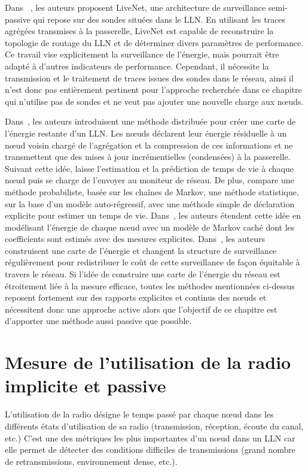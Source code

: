 Dans ~\cite{Chen:2008im}, les auteurs proposent LiveNet, une architecture de surveillance semi-passive  qui repose sur des sondes situées dans le \ac{LLN}.
En utilisant les traces agrégées transmises à la passerelle, LiveNet est capable de reconstruire la topologie de routage du \ac{LLN} et de déterminer divers paramètres de performance.
Ce travail vise explicitement la surveillance de l'énergie, mais pourrait être adapté à d'autres indicateurs de performance.
Cependant, il nécessite la transmission et le traitement de traces issues des sondes dans le réseau, ainsi il n'est donc pas entièrement pertinent pour l'approche recherchée dans ce chapitre qui n'utilise pas de sondes et ne veut pas ajouter une nouvelle charge aux nœuds.

Dans~\cite{Zhao:2002df}, les auteurs introduisent une méthode distribuée pour créer une carte de l'énergie restante d'un \ac{LLN}.
Les nœuds déclarent leur énergie résiduelle à un nœud voisin chargé de l'agrégation et la compression de ces informations et ne transmettent que des mises à jour incrémentielles (condensées) à la passerelle.
Suivant cette idée, \cite{Mini:2004zj} laisse l'estimation et la prédiction de temps de vie à chaque nœud puis se charge de l'envoyer au moniteur de réseau.
De plus, \cite{Mini:2004zj} compare une méthode probabiliste, basée sur les chaînes de Markov, une méthode statistique, sur la base d'un modèle auto-régressif, avec une  méthode simple de déclaration explicite pour estimer un temps de vie.
Dans~\cite{Hu:2007tb}, les auteurs étendent cette idée en modélisant l'énergie de chaque nœud avec un modèle de Markov caché dont les coefficients sont estimés avec des mesures explicites.
Dans~\cite{Chan:2009hl}, les auteurs construisent une carte de l'énergie et changent la structure de surveillance régulièrement pour redistribuer le coût de cette surveillance de façon équitable à travers le réseau.
Si l'idée de construire une carte de l'énergie du réseau est étroitement liée à la mesure efficace, toutes les méthodes mentionnées ci-dessus reposent fortement sur des rapports  explicites et continus des nœuds et nécessitent donc une approche active alors que l'objectif de ce chapitre est d'apporter une méthode aussi passive que possible.

\section{Mesure de l'utilisation de la radio implicite et passive}
\label{supervision:model}

L'utilisation de la radio désigne le temps passé par chaque nœud dans les différents états d'utilisation de sa radio (transmission, réception, écoute du canal, etc.)
C'est une des métriques les plus importantes d'un nœud dans un \ac{LLN} car elle permet de détecter des conditions difficiles de transmissions (grand nombre de retransmissions, environnement dense, etc.).

